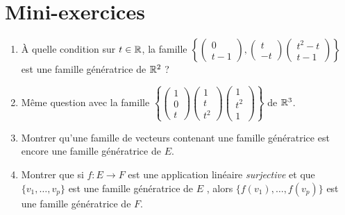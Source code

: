 \section{Mini-exercices}

\begin{frame}
\begin{miniexercice}
\begin{enumerate}
  \item \`A quelle condition sur $t\in\mathbb{R}$, la famille
$\left\{ 
  \left(\begin{smallmatrix} 0 \\ t-1 \end{smallmatrix}\right),
  \left(\begin{smallmatrix} t \\ -t \end{smallmatrix}\right)
  \left(\begin{smallmatrix} t^2-t \\ t-1 \end{smallmatrix}\right)
  \right\}$ 
  est une famille génératrice de $\mathbb{R}^2$ ?
  
  \item   Même question avec la famille  
  $\left\{ 
  \left(\begin{smallmatrix} 1 \\ 0 \\ t \end{smallmatrix}\right) 
  \left(\begin{smallmatrix} 1 \\ t \\ t^2 \end{smallmatrix}\right) 
  \left(\begin{smallmatrix} 1 \\ t^2 \\ 1 \end{smallmatrix}\right) 
  \right\}$ de $\mathbb{R}^3$.  
   
  \item Montrer qu'une famille de vecteurs contenant une famille 
  génératrice est encore une famille génératrice de $E$.
    
  \item Montrer que si $f : E \to F$ est une application linéaire \emph{surjective}
  et que $\{ v_1, \ldots, v_p \}$  est une famille génératrice de $E$ ,
  alors $\big\{ f(v_1), \ldots, f(v_p) \big\}$ est une famille génératrice de $F$.
\end{enumerate}
\end{miniexercice}
\end{frame}


